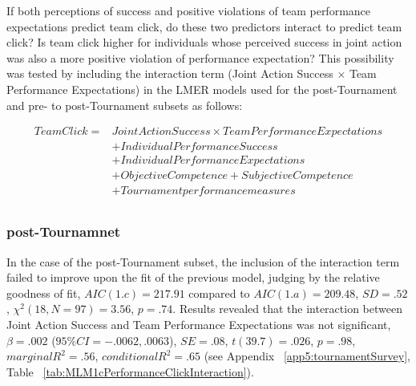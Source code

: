 If both perceptions of success and positive violations of team performance expectations predict team click, do these two predictors interact to predict team click?  Is team click higher for individuals whose perceived success in joint action was also a more positive violation of performance expectation?  This possibility was tested by including the interaction term (Joint Action Success $\times$ Team Performance Expectations) in the LMER models used for the post-Tournament and pre- to post-Tournament subsets as follows:


    \begin{align*}
      Team Click =  & Joint Action Success \times Team Performance Expectations \\
                &+ Individual Performance Success \\
                &+ Individual Performance Expectations \\
                &+ Objective Competence + Subjective Competence  \\
                &+ Tournament performance measures \\
    \end{align*}

  \bigskip

  \subsubsection{post-Tournamnet}
  In the case of the post-Tournament subset, the inclusion of the interaction term failed to improve upon the fit of the previous model, judging by the relative goodness of fit, $AIC(1.c) = 217.91$ compared to $AIC(1.a) = 209.48$, $SD = .52 $, $\chi^2(18, N = 97) = 3.56$, $ p =.74$.
  Results revealed that the interaction between Joint Action Success and Team Performance Expectations was not significant, $\beta = .002$ ($95\% CI =  -.0062, .0063$), $SE = .08$, $t(39.7) = .026$, $p = .98$, $marginal R^2 = .56$, $conditional R^2 = .65$ (see Appendix ~\ref{app5:tournamentSurvey}, Table ~\ref{tab:MLM1cPerformanceClickInteraction}).




